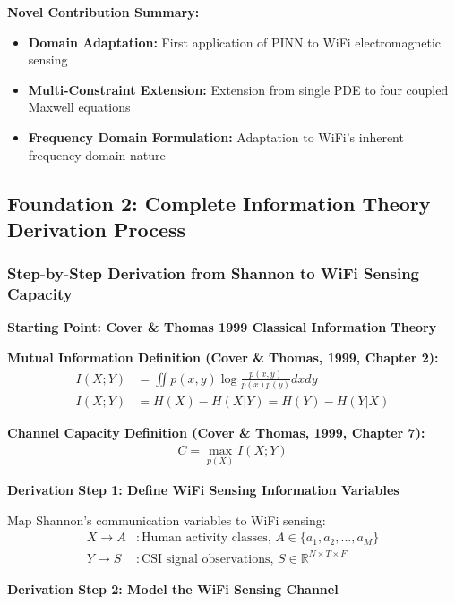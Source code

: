 \documentclass[12pt,a4paper]{article}
\begin{document}
\textbf{Novel Contribution Summary:}
\begin{itemize}
\item \textbf{Domain Adaptation:} First application of PINN to WiFi electromagnetic sensing
\item \textbf{Multi-Constraint Extension:} Extension from single PDE to four coupled Maxwell equations
\item \textbf{Frequency Domain Formulation:} Adaptation to WiFi's inherent frequency-domain nature
\end{itemize}

\subsection{Foundation 2: Complete Information Theory Derivation Process}

\subsubsection{Step-by-Step Derivation from Shannon to WiFi Sensing Capacity}

\textbf{Starting Point: Cover \& Thomas 1999 Classical Information Theory}

\textbf{Mutual Information Definition (Cover \& Thomas, 1999, Chapter 2):}
\begin{align}
I(X;Y) &= \iint p(x,y) \log \frac{p(x,y)}{p(x)p(y)} dx dy \label{eq:shannon_mi_original}\\
I(X;Y) &= H(X) - H(X|Y) = H(Y) - H(Y|X) \label{eq:mi_entropy_original}
\end{align}

\textbf{Channel Capacity Definition (Cover \& Thomas, 1999, Chapter 7):}
\begin{align}
C = \max_{p(X)} I(X;Y) \label{eq:shannon_capacity_original}
\end{align}

\textbf{Derivation Step 1: Define WiFi Sensing Information Variables}

Map Shannon's communication variables to WiFi sensing:
\begin{align}
X \rightarrow A &: \text{Human activity classes, } A \in \{a_1, a_2, ..., a_M\} \label{eq:activity_variable}\\
Y \rightarrow S &: \text{CSI signal observations, } S \in \mathbb{R}^{N \times T \times F} \label{eq:csi_variable}
\end{align}

\textbf{Derivation Step 2: Model the WiFi Sensing Channel}
\end{document}
